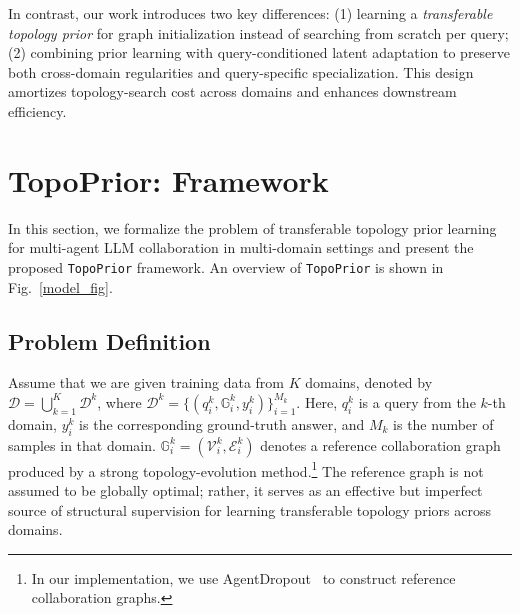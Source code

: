 \documentclass[lettersize,journal]{IEEEtran}
\theoremstyle{plain}
\begin{document}
In contrast, our work introduces two key differences: (1) learning a \emph{transferable topology prior} for graph initialization instead of searching from scratch per query; (2) combining prior learning with query-conditioned latent adaptation to preserve both cross-domain regularities and query-specific specialization. This design amortizes topology-search cost across domains and enhances downstream efficiency.



\section{TopoPrior: Framework}
In this section, we formalize the problem of transferable topology prior learning for multi-agent LLM collaboration in multi-domain settings and present the proposed \texttt{TopoPrior} framework. An overview of \texttt{TopoPrior} is shown in Fig.~\ref{model_fig}.

\subsection{Problem Definition}
Assume that we are given training data from $K$ domains, denoted by $\mathcal{D}=\bigcup_{k=1}^{K}\mathcal{D}^{k}$, where $\mathcal{D}^{k}=\{(q_i^{k},\mathbb{G}_i^{k},y_i^{k})\}_{i=1}^{M_k}$. Here, $q_i^{k}$ is a query from the $k$-th domain, $y_i^{k}$ is the corresponding ground-truth answer, and $M_k$ is the number of samples in that domain. $\mathbb{G}_i^{k}=(\mathcal{V}_i^{k},\mathcal{E}_i^{k})$ denotes a reference collaboration graph produced by a strong topology-evolution method.\footnote{In our implementation, we use AgentDropout~\cite{DBLP:conf/acl/WangW00Z0025} to construct reference collaboration graphs.} The reference graph is not assumed to be globally optimal; rather, it serves as an effective but imperfect source of structural supervision for learning transferable topology priors across domains.
\end{document}
